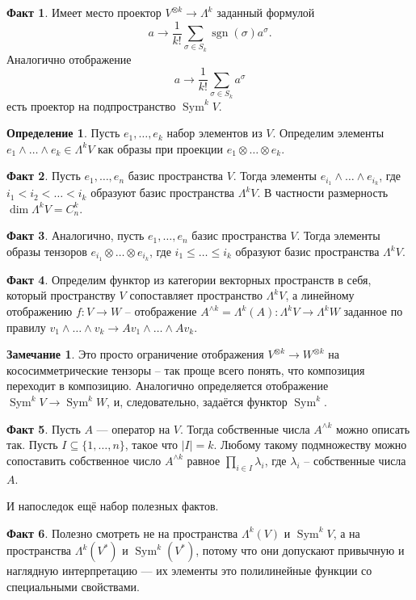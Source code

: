 \documentclass[10pt,a4paper,oneside]{book}
\theoremstyle{definition}
\newtheorem*{rem}{Замечание}
\newtheorem{defn}{Определение}
\newtheorem*{fact}{Факт}
\newcommand{\Sym}{\operatorname{Sym}}
\newcommand{\sgn}{\operatorname{sgn}}
\def\dfn{\begin{defn}}
\def\edfn{\end{defn}}
\def\rm{\begin{rem}}
\def\erm{\end{rem}}
\def\fct{\begin{fact}}
\def\efct{\end{fact}}
\begin{document}
\fct Имеет место проектор $V^{\otimes k} \to \Lambda^k$ заданный формулой 
$$a \to \frac{1}{k!} \sum_{\sigma \in S_k} \sgn (\sigma) a^{\sigma}.$$
Аналогично отображение  
$$a \to \frac{1}{k!} \sum_{\sigma \in S_k} a^{\sigma}$$
есть проектор на подпространство $\Sym^k V$.
\efct 

\dfn Пусть $e_1,\dots, e_k$ набор элементов из $V$. Определим элементы $e_1\wedge \dots \wedge e_k \in \Lambda^k V$ как образы при проекции $e_1\otimes \dots \otimes e_k$.
\edfn

\fct Пусть $e_1,\dots, e_n$ базис пространства $V$. Тогда элементы $e_{i_1}\wedge \dots \wedge e_{i_k}$, где $i_1<i_2< \dots < i_k$ образуют базис пространства $\Lambda^k V$. В частности размерность $\dim \Lambda^k V = C^k_n$.
\efct 

\fct Аналогично, пусть $e_1,\dots, e_n$ базис пространства $V$. Тогда элементы образы тензоров $e_{i_1}\otimes \dots \otimes e_{i_k}$, где $i_1\leq \dots \leq i_k$ образуют базис пространства $\Lambda^k V$.
\efct

\fct Определим функтор из категории векторных пространств в себя, который пространству $V$ сопоставляет пространство $\Lambda^k V$, а линейному отображению $f\colon V \to W$ -- отображение $A^{\wedge k} = \Lambda^k (A) \colon \Lambda^k V \to \Lambda^k W$ заданное по правилу $v_1\wedge \dots \wedge v_k \to A v_1 \wedge \dots \wedge A v_k$. 
\efct 

\rm Это просто ограничение отображения $V^{\otimes k} \to W^{\otimes k}$  на кососимметрические тензоры -- так проще всего понять, что композиция переходит в композицию. Аналогично определяется отображение $\Sym^k V \to \Sym^k W$, и, следовательно, задаётся функтор $\Sym^k$.
\erm


\fct Пусть $A$ --- оператор на $V$. Тогда собственные числа $A^{\wedge k}$ можно описать так. Пусть $I\subseteq \{1,\dots,n\}$, такое что $|I|=k$. Любому такому подмножеству можно сопоставить собственное число $A^{\wedge k}$ равное $\prod_{i \in I}\lambda_i$, где $\lambda_i$ -- собственные числа $A$.
\efct

И напоследок ещё набор полезных фактов.

\fct Полезно смотреть не на пространства $\Lambda^k (V)$ и $\Sym^k V$, а на пространства $\Lambda^k(V^*)$ и $\Sym^k(V^*)$, потому что они допускают привычную и наглядную интерпретацию --- их элементы это полилинейные функции со специальными свойствами.
\efct
\end{document}
